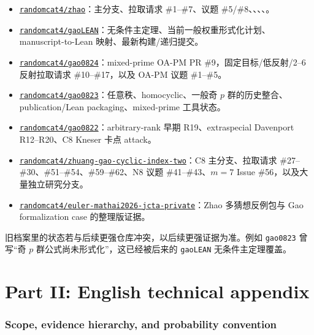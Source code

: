 \documentclass[11pt,a4paper]{ctexart}
\newcommand{\repo}[2]{\href{#2}{\texttt{#1}}}
\begin{document}
\begin{itemize}
\item \repo{randomcat4/zhao}{https://github.com/randomcat4/zhao}：主分支、拉取请求 \#1--\#7、议题 \#5/\#8、、、、。
\item \repo{randomcat4/gaoLEAN}{https://github.com/randomcat4/gaoLEAN}：无条件主定理、当前一般权重形式化计划、manuscript-to-Lean 映射、最新构建/递归提交。
\item \repo{randomcat4/gao0824}{https://github.com/randomcat4/gao0824}：mixed-prime OA-PM PR \#9，固定目标/低反射/2--6 反射拉取请求 \#10--\#17，以及 OA-PM 议题 \#1--\#5。
\item \repo{randomcat4/gao0823}{https://github.com/randomcat4/gao0823}：任意秩、homocyclic、一般奇 $p$ 群的历史整合、publication/Lean packaging、mixed-prime 工具状态。
\item \repo{randomcat4/gao0822}{https://github.com/randomcat4/gao0822}：arbitrary-rank 早期 R19、extraspecial Davenport R12--R20、C8 Kneser 卡点 attack。
\item \repo{randomcat4/zhuang-gao-cyclic-index-two}{https://github.com/randomcat4/zhuang-gao-cyclic-index-two}：C8 主分支、拉取请求 \#27--\#30、\#51--\#54、\#59--\#62、N8 议题 \#41--\#43、$m=7$ Issue \#56，以及大量独立研究分支。
\item \repo{randomcat4/euler-mathai2026-jcta-private}{https://github.com/randomcat4/euler-mathai2026-jcta-private}：Zhao 多猜想反例包与 Gao formalization case 的整理版证据。
\end{itemize}

旧档案里的状态若与后续更强仓库冲突，以后续更强证据为准。例如 \texttt{gao0823} 曾写“奇 $p$ 群公式尚未形式化”，这已经被后来的 \texttt{gaoLEAN} 无条件主定理覆盖。

\newpage
\part*{Part II: English technical appendix}

\section{Scope, evidence hierarchy, and probability convention}
\end{document}
